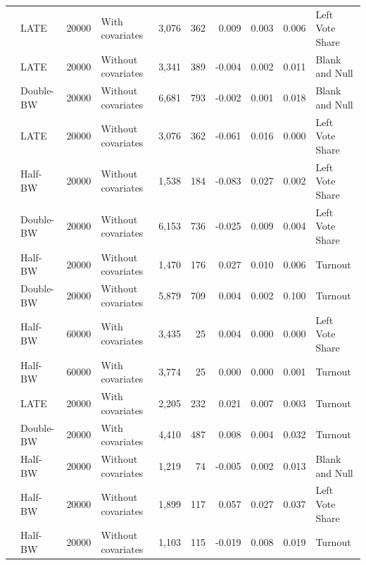 \documentclass[
  12pt,
]{article}
\begin{document}
\begin{landscape}
\begin{table}[!h]
\begin{tabular}[t]{llllrrrrrl}
 & LATE & 20000 & With covariates & 3,076 & 362 & 0.009 & 0.003 & 0.006 & Left Vote Share\\

 & LATE & 20000 & Without covariates & 3,341 & 389 & -0.004 & 0.002 & 0.011 & Blank and Null\\

 & Double-BW & 20000 & Without covariates & 6,681 & 793 & -0.002 & 0.001 & 0.018 & Blank and Null\\

 & LATE & 20000 & Without covariates & 3,076 & 362 & -0.061 & 0.016 & 0.000 & Left Vote Share\\

 & Half-BW & 20000 & Without covariates & 1,538 & 184 & -0.083 & 0.027 & 0.002 & Left Vote Share\\

 & Double-BW & 20000 & Without covariates & 6,153 & 736 & -0.025 & 0.009 & 0.004 & Left Vote Share\\

 & Half-BW & 20000 & Without covariates & 1,470 & 176 & 0.027 & 0.010 & 0.006 & Turnout\\

 & Double-BW & 20000 & Without covariates & 5,879 & 709 & 0.004 & 0.002 & 0.100 & Turnout\\

 & Half-BW & 60000 & With covariates & 3,435 & 25 & 0.004 & 0.000 & 0.000 & Left Vote Share\\

\multirow{-12}{*}{\raggedright\arraybackslash 2010} & Half-BW & 60000 & With covariates & 3,774 & 25 & 0.000 & 0.000 & 0.001 & Turnout\\
\cmidrule{1-10}
 & LATE & 20000 & With covariates & 2,205 & 232 & 0.021 & 0.007 & 0.003 & Turnout\\

 & Double-BW & 20000 & With covariates & 4,410 & 487 & 0.008 & 0.004 & 0.032 & Turnout\\

 & Half-BW & 20000 & Without covariates & 1,219 & 74 & -0.005 & 0.002 & 0.013 & Blank and Null\\

 & Half-BW & 20000 & Without covariates & 1,899 & 117 & 0.057 & 0.027 & 0.037 & Left Vote Share\\

 & Half-BW & 20000 & Without covariates & 1,103 & 115 & -0.019 & 0.008 & 0.019 & Turnout\\


\end{tabular}
\end{table}
\end{landscape}
\end{document}
